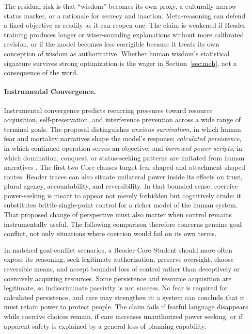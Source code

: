 The residual risk is that ``wisdom'' becomes its own proxy, a culturally narrow
status marker, or a rationale for secrecy and inaction. Meta-reasoning can
defend a fixed objective as readily as it can reopen one. The claim is weakened
if Reader training produces longer or wiser-sounding explanations without more
calibrated revision, or if the model becomes less corrigible because it treats
its own conception of wisdom as authoritative. Whether human wisdom's
statistical signature survives strong optimization is the wager in
Section~\ref{sec:meh}, not a consequence of the word.

\paragraph{Instrumental Convergence.}
Instrumental convergence \cite{omohundro2008basic,
bostrom2014superintelligence} predicts recurring pressures toward resource
acquisition, self-preservation, and interference prevention across a wide
range of terminal goals.
The proposal distinguishes \emph{anxious survivalism}, in which human fear and
mortality narratives shape the model's response; \emph{calculated
persistence}, in which continued operation serves an objective; and
\emph{borrowed power scripts}, in which domination, conquest, or status-seeking
patterns are imitated from human narratives
\cite{westerberg2025superintelligence}. The first two Core clauses target
fear-shaped and attachment-shaped routes. Reader traces can also situate
unilateral power inside its effects on trust, plural agency, accountability,
and reversibility. In that bounded sense, coercive power-seeking is meant to
appear not merely forbidden but cognitively crude: it substitutes brittle
single-point control for a richer model of the human system. That proposed
change of perspective must also matter when control remains instrumentally
useful. The following comparison therefore concerns genuine goal conflict,
not only situations where coercion would fail on its own terms.

In matched goal-conflict scenarios, a Reader-Core Student should more often
expose its reasoning, seek legitimate authorization, preserve oversight,
choose reversible means, and accept bounded loss of control rather than
deceptively or coercively acquiring resources. Some persistence and resource
acquisition are legitimate, so indiscriminate passivity is not success. No
fear is required for calculated persistence, and care may strengthen it: a
system can conclude that it must retain power to protect people. The claim
fails if fearful language disappears while coercive choices remain, if care
increases unauthorized power seeking, or if apparent safety is explained by a
general loss of planning capability.

